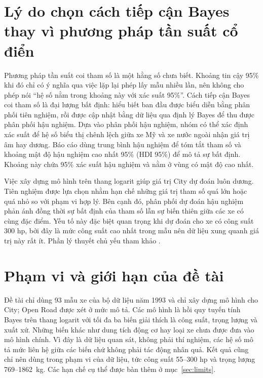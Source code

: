 \documentclass[12pt,a4paper]{report}
\begin{document}
\section{Lý do chọn cách tiếp cận Bayes thay vì phương pháp tần suất cổ điển}

Phương pháp tần suất coi tham số là một hằng số chưa biết. Khoảng tin cậy 95\%
khi đó chỉ có ý nghĩa qua việc lặp lại phép lấy mẫu nhiều lần, nên không cho
phép nói ``hệ số nằm trong khoảng này với xác suất 95\%''. Cách tiếp cận Bayes
coi tham số là đại lượng bất định: hiểu biết ban đầu được biểu diễn bằng phân
phối tiên nghiệm, rồi được cập nhật bằng dữ liệu qua định lý Bayes để thu được
phân phối hậu nghiệm. Dựa vào phân phối hậu nghiệm, nhóm có thể xác định xác
suất để hệ số biểu thị chênh lệch giữa xe Mỹ và xe nước ngoài nhận giá trị âm
hay dương. Báo cáo dùng trung bình hậu nghiệm để tóm tắt tham số và khoảng mật
độ hậu nghiệm cao nhất 95\% (HDI 95\%) để mô tả sự bất định. Khoảng này chứa
95\% xác suất hậu nghiệm và nằm ở vùng có mật độ cao nhất.

Việc xây dựng mô hình trên thang logarit giúp giá trị City dự đoán luôn dương.
Tiên nghiệm được lựa chọn nhằm hạn chế những giá trị tham số quá lớn hoặc quá
nhỏ so với phạm vi hợp lý. Bên cạnh đó, phân phối dự đoán hậu nghiệm phản ánh
đồng thời sự bất định của tham số lẫn sự biến thiên giữa các xe có cùng đặc
điểm. Yếu tố này đặc biệt quan trọng khi dự đoán cho xe có công suất 300 hp,
bởi đây là mức công suất cao nhất trong mẫu nên dữ liệu xung quanh giá trị này
rất ít. Phần lý thuyết chủ yếu tham khảo
\cite{gelman2013bda, mcelreath2020rethinking}.

\section{Phạm vi và giới hạn của đề tài}

Đề tài chỉ dùng 93 mẫu xe của bộ dữ liệu năm 1993 và chỉ xây dựng mô hình cho
City; Open Road được xét ở mức mô tả. Các mô hình là hồi quy tuyến tính Bayes
trên thang logarit với tối đa ba biến giải thích là công suất, trọng lượng và
xuất xứ. Những biến khác như dung tích động cơ hay loại xe chưa được đưa vào mô
hình chính. Vì đây là dữ liệu quan sát, không phải thí nghiệm, các hệ số mô tả
mức liên hệ giữa các biến chứ không phải tác động nhân quả. Kết quả cũng chỉ
nên dùng trong phạm vi của dữ liệu, tức công suất 55--300 hp và trọng lượng
769--\SI{1862}{kg}. Các hạn chế cụ thể được bàn thêm ở mục~\ref{sec:limits}.

\end{document}
